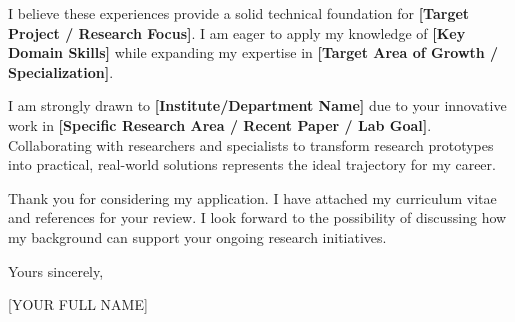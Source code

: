 \documentclass[11pt,a4paper]{article}
\newcommand{\ApplicantName}{[YOUR FULL NAME]}
\begin{document}
I believe these experiences provide a solid technical foundation for \textbf{[Target Project / Research Focus]}. I am eager to apply my knowledge of \textbf{[Key Domain Skills]} while expanding my expertise in \textbf{[Target Area of Growth / Specialization]}.

I am strongly drawn to \textbf{[Institute/Department Name]} due to your innovative work in \textbf{[Specific Research Area / Recent Paper / Lab Goal]}. Collaborating with researchers and specialists to transform research prototypes into practical, real-world solutions represents the ideal trajectory for my career.

Thank you for considering my application. I have attached my curriculum vitae and references for your review. I look forward to the possibility of discussing how my background can support your ongoing research initiatives.

\vspace{1.5em}

Yours sincerely,

\vspace{1em}

\ApplicantName
\end{document}
